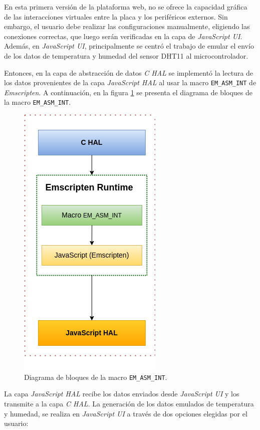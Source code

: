 En esta primera versión de la plataforma web, no se ofrece la capacidad gráfica de las interacciones virtuales entre la placa y los periféricos externos. Sin embargo, el usuario debe realizar las configuraciones manualmente, eligiendo las conexiones correctas, que luego serán verificadas en la capa de \textit{JavaScript UI}.
Además, en \textit{JavaScript UI}, principalmente se centró el trabajo de emular el envío de los datos de temperatura y humedad del sensor DHT11 al microcontrolador.

Entonces, en la capa de abstracción de datos \textit{C HAL} se implementó la lectura de los datos provenientes de la capa \textit{JavaScript HAL} al usar la macro \texttt{EM\_ASM\_INT} de \textit{Emscripten}. A continuación, en la figura \ref{fig:dht11Emscripten} se presenta el diagrama de bloques de la macro \texttt{EM\_ASM\_INT}.

\begin{figure}[ht]
	\centering
	\includegraphics[scale=.53]{./Figures/dht11Emscripten.png}
	\caption{Diagrama de bloques de la macro \texttt{EM\_ASM\_INT}.}
	\label{fig:dht11Emscripten}
\end{figure}

La capa \textit{JavaScript HAL} recibe los datos enviados desde \textit{JavaScript UI} y los transmite a la capa \textit{C HAL}. La generación de los datos  emulados de temperatura y humedad, se realiza en \textit{JavaScript UI} a través de dos opciones elegidas por el usuario:
 
